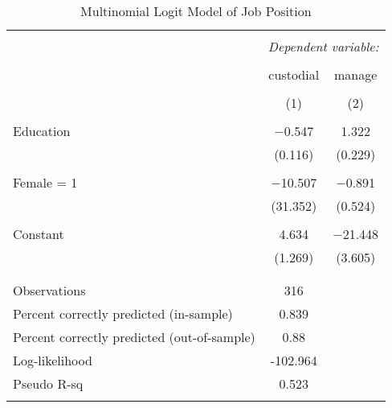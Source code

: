 \documentclass[
  12pt,
]{article}
\begin{document}
\begin{table}[t] \centering 
  \caption{Multinomial Logit Model of Job Position} 
  \label{job} 
\begin{tabular}{@{\extracolsep{5pt}}lcc} 
\\[-1.8ex]\hline 
\hline \\[-1.8ex] 
 & \multicolumn{2}{c}{\textit{Dependent variable:}} \\ 
\cline{2-3} 
\\[-1.8ex] & custodial & manage \\ 
\\[-1.8ex] & (1) & (2)\\ 
\hline \\[-1.8ex] 
 Education & $-$0.547 & 1.322 \\ 
  & (0.116) & (0.229) \\ 
  & & \\ 
 Female = 1 & $-$10.507 & $-$0.891 \\ 
  & (31.352) & (0.524) \\ 
  & & \\ 
 Constant & 4.634 & $-$21.448 \\ 
  & (1.269) & (3.605) \\ 
  & & \\ 
\hline \\[-1.8ex] 
Observations & 316 &  \\ 
Percent correctly predicted (in-sample) & 0.839 &  \\ 
Percent correctly predicted (out-of-sample) & 0.88 &  \\ 
Log-likelihood & -102.964 &  \\ 
Pseudo R-sq & 0.523 &  \\ 
\hline 
\hline \\[-1.8ex] 
\end{tabular} 
\end{table}
\end{document}
